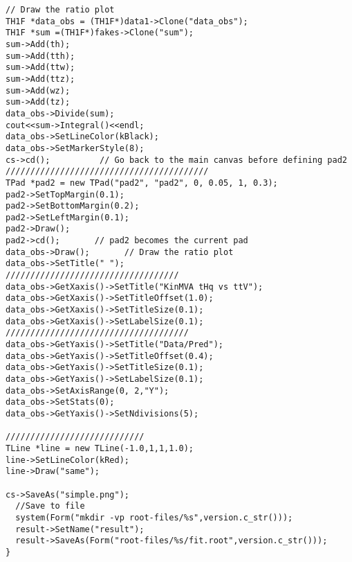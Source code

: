 \begin{verbatim}
// Draw the ratio plot
TH1F *data_obs = (TH1F*)data1->Clone("data_obs");
TH1F *sum =(TH1F*)fakes->Clone("sum");
sum->Add(th);
sum->Add(tth);
sum->Add(ttw);
sum->Add(ttz);
sum->Add(wz);
sum->Add(tz);
data_obs->Divide(sum);
cout<<sum->Integral()<<endl;
data_obs->SetLineColor(kBlack);
data_obs->SetMarkerStyle(8);
cs->cd();          // Go back to the main canvas before defining pad2
/////////////////////////////////////////
TPad *pad2 = new TPad("pad2", "pad2", 0, 0.05, 1, 0.3);
pad2->SetTopMargin(0.1);
pad2->SetBottomMargin(0.2);
pad2->SetLeftMargin(0.1);
pad2->Draw();
pad2->cd();       // pad2 becomes the current pad
data_obs->Draw();       // Draw the ratio plot
data_obs->SetTitle(" ");
///////////////////////////////////
data_obs->GetXaxis()->SetTitle("KinMVA tHq vs ttV");
data_obs->GetXaxis()->SetTitleOffset(1.0);
data_obs->GetXaxis()->SetTitleSize(0.1);
data_obs->GetXaxis()->SetLabelSize(0.1);
/////////////////////////////////////
data_obs->GetYaxis()->SetTitle("Data/Pred");
data_obs->GetYaxis()->SetTitleOffset(0.4);
data_obs->GetYaxis()->SetTitleSize(0.1);
data_obs->GetYaxis()->SetLabelSize(0.1);
data_obs->SetAxisRange(0, 2,"Y");
data_obs->SetStats(0);
data_obs->GetYaxis()->SetNdivisions(5);

////////////////////////////
TLine *line = new TLine(-1.0,1,1,1.0);
line->SetLineColor(kRed);
line->Draw("same");

cs->SaveAs("simple.png");
  //Save to file
  system(Form("mkdir -vp root-files/%s",version.c_str()));
  result->SetName("result");
  result->SaveAs(Form("root-files/%s/fit.root",version.c_str()));
}
    
\end{verbatim}